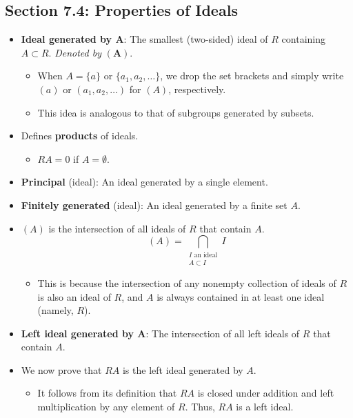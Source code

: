 \documentclass[../notes.tex]{subfiles}
\begin{document}
\subsection*{Section 7.4: Properties of Ideals}
\begin{itemize}
    \item {}\textbf{Ideal generated by $\bm{A}$}: The smallest (two-sided) ideal of $R$ containing $A\subset R$. \emph{Denoted by} $\bm{(A)}$.
    \begin{itemize}
        \item When $A=\{a\}$ or $\{a_1,a_2,\dots\}$, we drop the set brackets and simply write $(a)$ or $(a_1,a_2,\dots)$ for $(A)$, respectively.
        \item This idea is analogous to that of subgroups generated by subsets.
    \end{itemize}
    \item Defines \textbf{products} of ideals.
    \begin{itemize}
        \item $RA=0$ if $A=\emptyset$.
    \end{itemize}
    \item \textbf{Principal} (ideal): An ideal generated by a single element.
    \item \textbf{Finitely generated} (ideal): An ideal generated by a finite set $A$.
    \item $(A)$ is the intersection of all ideals of $R$ that contain $A$.
    \begin{equation*}
        (A) = \bigcap_{\substack{I\text{ an ideal}\\A\subset I}}I
    \end{equation*}
    \begin{itemize}
        \item This is because the intersection of any nonempty collection of ideals of $R$ is also an ideal of $R$, and $A$ is always contained in at least one ideal (namely, $R$).
    \end{itemize}
    \item \textbf{Left ideal generated by $\bm{A}$}: The intersection of all left ideals of $R$ that contain $A$.
    \item We now prove that $RA$ is the left ideal generated by $A$.
    \begin{itemize}
        \item It follows from its definition that $RA$ is closed under addition and left multiplication by any element of $R$. Thus, $RA$ is a left ideal.

\end{itemize}
\end{itemize}
\end{document}
